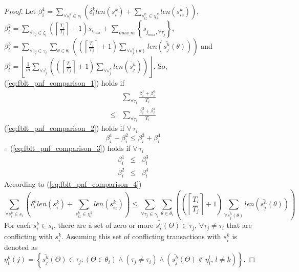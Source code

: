 \documentclass[prodmode,acmtecs]{acmsmall}
\begin{document}
\begin{compactenum}
\begin{proof}
Let $\beta_{i}^{1}=\sum_{\forall s_{i}^{k}\in s_{i}}\left(\delta_{i}^{k}len(s_{i}^{k})+\sum_{s_{iz}^{k}\in\chi_{i}^{k}}len(s_{iz}^{k})\right)$,
$\beta_{i}^{2}=\sum_{\forall\tau_{j}\in\zeta_{i}}\left(\left\lceil \frac{T_{i}}{T_{j}}\right\rceil +1\right)s_{i_{max}}+\sum_{max\_m}\left\{ s_{j_{max},\forall\bar{\tau_{j}^{l}}}\right\} $,
$\beta_{i}^{3}=\sum_{\forall\tau_{j}\in\gamma_{i}}\sum_{\theta\in\theta_{i}}\left(\left(\left\lceil \frac{T_{i}}{T_{j}}\right\rceil +1\right)\sum_{\forall\bar{s_{j}^{h}}(\theta)}len\left(\bar{s_{j}^{h}}(\theta)\right)\right)$
and $\beta_{i}^{4}=\left\lfloor \frac{1}{m}\sum_{\forall\bar{\tau_{j}^{l}}}\left(\left(\left\lceil \frac{T_{i}}{T_{j}}\right\rceil +1\right)\sum_{\forall\ddot{s_{j}^{h}}}len\left(\ddot{s_{j}^{h}}\right)\right)\right\rfloor $.
So, (\ref{eq:fblt_pnf_comparison_1}) holds if 
\begin{eqnarray}
 & \sum_{\forall\tau_{i}}\frac{\beta_{i}^{1}+\beta_{i}^{2}}{T_{i}}\label{eq:fblt_pnf_comparison_2}\\
\le & \sum_{\forall\tau_{i}}\frac{\beta_{i}^{3}+\beta_{i}^{4}}{T_{i}}\nonumber 
\end{eqnarray}
(\ref{eq:fblt_pnf_comparison_2}) holds if $\forall\,\tau_{i}$
\begin{equation}
\beta_{i}^{1}+\beta_{i}^{2}\le\beta_{i}^{3}+\beta_{i}^{4}\label{eq:fblt_pnf_comparison_3}
\end{equation}
$\therefore$ (\ref{eq:fblt_pnf_comparison_3}) holds if $\forall\,\tau_{i}$
\begin{eqnarray}
\beta_{i}^{1} & \le & \beta_{i}^{3}\label{eq:fblt_pnf_comparison_4}\\
\beta_{i}^{2} & \le & \beta_{i}^{4}\label{eq:fblt_pnf_comparison_5}
\end{eqnarray}
According to (\ref{eq:fblt_pnf_comparison_4})
\begin{equation}
\sum_{\forall s_{i}^{k}\in s_{i}}\left(\delta_{i}^{k}len(s_{i}^{k})+\sum_{s_{iz}^{k}\in\chi_{i}^{k}}len(s_{iz}^{k})\right)\le\sum_{\forall\tau_{j}\in\gamma_{i}}\sum_{\theta\in\theta_{i}}\left(\left(\left\lceil \frac{T_{i}}{T_{j}}\right\rceil +1\right)\sum_{\forall\bar{s_{j}^{h}}(\theta)}len\left(\bar{s_{j}^{h}}(\theta)\right)\right)\label{eq:fblt_pnf_comparison_6}
\end{equation}
For each $s_{i}^{k}\in s_{i}$, there are a set of zero or more $\bar{s_{j}^{h}}(\Theta)\in\tau_{j},\,\forall\tau_{j}\ne\tau_{i}$
that are conflicting with $s_{i}^{k}$. Assuming this set of conflicting
transactions with $s_{i}^{k}$ is denoted as $\eta_{i}^{k}(j)=\left\{ \bar{s_{j}^{h}}(\Theta)\in\tau_{j}:\left(\Theta\in\theta_{i}\right)\wedge\left(\tau_{j}\ne\tau_{i}\right)\wedge\left(\bar{s_{j}^{h}}(\Theta)\not\in\eta_{i}^{l},\, l\ne k\right)\right\} $.

\end{proof}
\end{compactenum}
\end{document}
